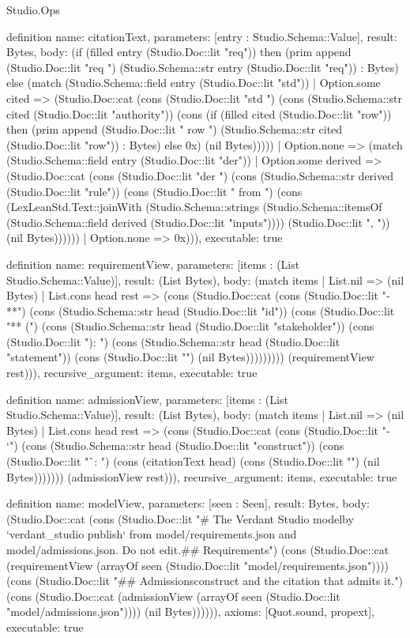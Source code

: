 \begin{lexlean}{Studio.Ops}
\begin{semanticmodule}
{definition{
  name: citationText,
  parameters: [entry : Studio.Schema::Value],
  result: Bytes,
  body: (if (filled entry (Studio.Doc::lit "req")) then (prim append (Studio.Doc::lit "req ") (Studio.Schema::str entry (Studio.Doc::lit "req")) : Bytes) else (match (Studio.Schema::field entry (Studio.Doc::lit "std"))
    | Option.some cited => (Studio.Doc::cat (cons (Studio.Doc::lit "std ") (cons (Studio.Schema::str cited (Studio.Doc::lit "authority")) (cons (if (filled cited (Studio.Doc::lit "row")) then (prim append (Studio.Doc::lit " row ") (Studio.Schema::str cited (Studio.Doc::lit "row")) : Bytes) else 0x) (nil Bytes)))))
    | Option.none => (match (Studio.Schema::field entry (Studio.Doc::lit "der"))
      | Option.some derived => (Studio.Doc::cat (cons (Studio.Doc::lit "der ") (cons (Studio.Schema::str derived (Studio.Doc::lit "rule")) (cons (Studio.Doc::lit " from ") (cons (LexLeanStd.Text::joinWith (Studio.Schema::strings (Studio.Schema::itemsOf (Studio.Schema::field derived (Studio.Doc::lit "inputs")))) (Studio.Doc::lit ", ")) (nil Bytes))))))
      | Option.none => 0x))),
  executable: true
}

definition{
  name: requirementView,
  parameters: [items : (List Studio.Schema::Value)],
  result: (List Bytes),
  body: (match items
    | List.nil => (nil Bytes)
    | List.cons head rest => (cons (Studio.Doc::cat (cons (Studio.Doc::lit "- **") (cons (Studio.Schema::str head (Studio.Doc::lit "id")) (cons (Studio.Doc::lit "** (") (cons (Studio.Schema::str head (Studio.Doc::lit "stakeholder")) (cons (Studio.Doc::lit "): ") (cons (Studio.Schema::str head (Studio.Doc::lit "statement")) (cons (Studio.Doc::lit "\n") (nil Bytes))))))))) (requirementView rest))),
  recursive_argument: items,
  executable: true
}

definition{
  name: admissionView,
  parameters: [items : (List Studio.Schema::Value)],
  result: (List Bytes),
  body: (match items
    | List.nil => (nil Bytes)
    | List.cons head rest => (cons (Studio.Doc::cat (cons (Studio.Doc::lit "- `") (cons (Studio.Schema::str head (Studio.Doc::lit "construct")) (cons (Studio.Doc::lit "`: ") (cons (citationText head) (cons (Studio.Doc::lit "\n") (nil Bytes))))))) (admissionView rest))),
  recursive_argument: items,
  executable: true
}

definition{
  name: modelView,
  parameters: [seen : Seen],
  result: Bytes,
  body: (Studio.Doc::cat (cons (Studio.Doc::lit "# The Verdant Studio model\n\nGenerated by `verdant_studio publish` from model/requirements.json and model/admissions.json. Do not edit.\n\n## Requirements\n\n") (cons (Studio.Doc::cat (requirementView (arrayOf seen (Studio.Doc::lit "model/requirements.json")))) (cons (Studio.Doc::lit "\n## Admissions\n\nEach construct and the citation that admits it.\n\n") (cons (Studio.Doc::cat (admissionView (arrayOf seen (Studio.Doc::lit "model/admissions.json")))) (nil Bytes)))))),
  axioms: [Quot.sound, propext],
  executable: true
}

}
\end{semanticmodule}
\end{lexlean}
